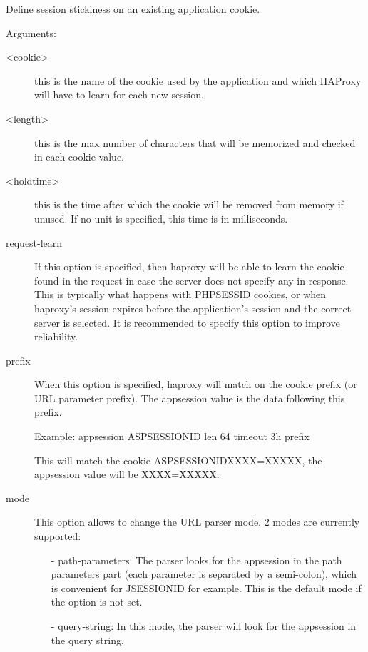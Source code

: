   Define session stickiness on an existing application cookie.
  

  Arguments:
  \begin{description}

  \item[<cookie>]   this is the name of the cookie used by the application and which
               HAProxy will have to learn for each new session.

  \item[<length>]   this is the max number of characters that will be memorized and
               checked in each cookie value.

  \item[<holdtime>] this is the time after which the cookie will be removed from
               memory if unused. If no unit is specified, this time is in
               milliseconds.

  \item[request-learn]
               If this option is specified, then haproxy will be able to learn
               the cookie found in the request in case the server does not
               specify any in response. This is typically what happens with
               PHPSESSID cookies, or when haproxy's session expires before
               the application's session and the correct server is selected.
               It is recommended to specify this option to improve reliability.

  \item[prefix]     When this option is specified, haproxy will match on the cookie
               prefix (or URL parameter prefix). The appsession value is the
               data following this prefix.

               \begin{example}{Example:}
               appsession ASPSESSIONID len 64 timeout 3h prefix
               \end{example}

               This will match the cookie ASPSESSIONIDXXXX=XXXXX,
               the appsession value will be XXXX=XXXXX.

  \item[mode]       This option allows to change the URL parser mode.
               2 modes are currently supported:
               \begin{itemize}
               \item[-] path-parameters:
                 The parser looks for the appsession in the path parameters
                 part (each parameter is separated by a semi-colon), which is
                 convenient for JSESSIONID for example.
                 This is the default mode if the option is not set.
               \item[-] query-string:
                 In this mode, the parser will look for the appsession in the
                 query string.
              \end{itemize}
  \end{description}

